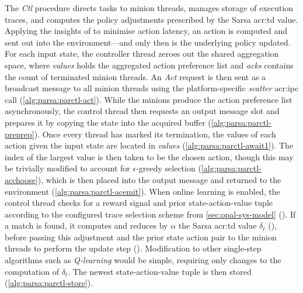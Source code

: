 The \emph{Ctl} procedure directs tasks to minion threads, manages storage of execution traces, and computes the policy adjustments prescribed by the Sarsa \gls{acr:td} value.
Applying the insights of \textcite{DBLP:journals/firai/TravnikMSP18} to minimise action latency, an action is computed and sent out into the environment---and only then is the underlying policy updated.
For each input state, the controller thread zeroes out the shared aggregation space, where \emph{values} holds the aggregated action preference list and \emph{acks} contains the count of terminated minion threads.
An \emph{Act} request is then sent as a broadcast message to all minion threads using the platform-specific \emph{scatter} \gls{acr:ipc} call (\cref{alg:parsa:parctl-act}).
While the minions produce the action preference list asynchronously, the control thread then requests an output message slot and prepares it by copying the state into the acquired buffer (\cref{alg:parsa:parctl-preprep}).
Once every thread has marked its termination, the values of each action given the input state are located in \emph{values} (\cref{alg:parsa:parctl-await1}).
The index of the largest value is then taken to be the chosen action, though this may be trivially modified to account for $\epsilon$-greedy selection (\cref{alg:parsa:parctl-acchoose}), which is then placed into the output message and returned to the environment (\cref{alg:parsa:parctl-acemit}).
When online learning is enabled, the control thread checks for a reward signal and prior state-action-value tuple according to the configured trace selection scheme from \cref{sec:opal-sys-model} ().
If a match is found, it computes and reduces by $\alpha$ the Sarsa \gls{acr:td} value $\delta_t$ (), before passing this adjustment and the prior state action pair to the minion threads to perform the update step ().
Modification to other single-step algorithms such as \emph{Q-learning} would be simple, requiring only changes to the computation of $\delta_t$.
The newest state-action-value tuple is then stored (\cref{alg:parsa:parctl-store}).

